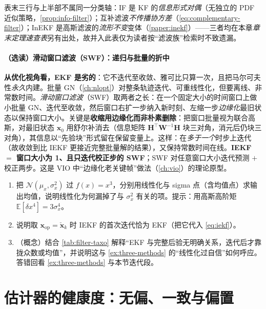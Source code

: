 \noindent 表末三行与上半部不属同一分类轴：IF 是 KF 的\emph{信息形式对偶}（无独立的 PDF 近似策略，\cref{prop:info-filter}）；互补滤波\emph{不传播协方差}（\cref{eq:complementary-filter}）；InEKF 是高斯滤波的\emph{流形不变}变体（\cref{paper:inekf}）——三者均在本章\emph{章末定理速查表}另有出处，故并入此表仅为读者按“滤波族”检索时不致遗漏。

\paragraph{（选读）滑动窗口滤波（SWF）：递归与批量的折中}\label{par:swf}
\textbf{从优化视角看，EKF 是劣的}：它不迭代至收敛、雅可比只算一次，且把马尔可夫性\emph{永久}内建。批量 GN（\cref{ch:nlopt}）对整条轨迹迭代、可重线性化，但要离线、非常数时间。\emph{滑动窗口滤波}（SWF\cite{barfoot2024state}）取两者之长：在一个固定大小的时间窗口上做小批量 GN、迭代至收敛，然后窗口右扩一步纳入新时刻、左缩一步\emph{边缘化}最旧状态以保持窗口大小。关键是\textbf{收缩用边缘化而非朴素删除}：把窗口批量视为联合高斯，对最旧状态 $\mathbf{x}_0$ 用舒尔补消去（信息矩阵 $\mathbf{H}^\top\mathbf{W}^{-1}\mathbf{H}$ 块三对角，消元后仍块三对角），其信息以“先验块”形式留在保留变量上。这样：在\emph{多于一个}时步上迭代（故收敛到比 IEKF 更接近完整批量解的结果），又保持常数时间在线。\textbf{IEKF $=$ 窗口大小为 1、且只迭代校正步的 SWF}；SWF 对任意窗口大小迭代预测 $+$ 校正两步。这是 VIO 中“边缘化老关键帧”做法（\cref{ch:vio}）的理论原型。

\begin{practice}
\begin{enumerate}
  \item 把 $\mathcal{N}(\mu_x,\sigma_x^2)$ 过 $f(x)=x^3$，分别用线性化与 sigma 点（含均值点）求输出均值，说明线性化为何漏掉了与 $\sigma_x^2$ 有关的项。提示：用高斯高阶矩 $\mathbb{E}[\delta x^4]=3\sigma_x^4$。
  \item 说明取 $\mathbf{x}_{\text{op}}=\check{\mathbf{x}}_k$ 时 IEKF 的首次迭代恰为 EKF（把它代入 \cref{eq:iekf}）。
  \item （概念）结合 \cref{tab:filter-taxo} 解释“EKF 与完整后验无明确关系，迭代后才靠拢众数或均值”，并说明这与 \cref{ex:three-methods} 的“线性化过自信”如何呼应。答错回看 \cref{ex:three-methods} 与本节迭代段。
\end{enumerate}
\end{practice}

\section{估计器的健康度：无偏、一致与偏置}
\label{sec:consistency}

